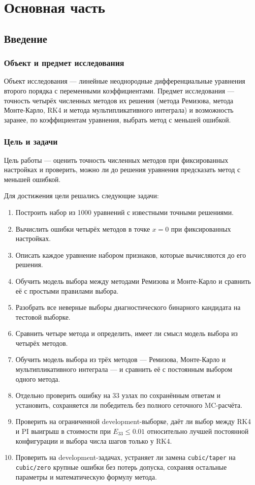 \documentclass[14pt,a4paper]{extarticle}
\DeclareRobustCommand{\code}[1]{\texttt{\let\savedunderscore\_\def\_{\savedunderscore\allowbreak}#1}}
\begin{document}
\section{Основная часть}
\subsection{Введение}
\subsubsection{Объект и предмет исследования}
Объект исследования --- линейные неоднородные дифференциальные
уравнения второго порядка с переменными коэффициентами. Предмет
исследования --- точность четырёх численных методов их решения (метода
Ремизова, метода Монте-Карло, RK4 и метода мультипликативного интеграла)
и возможность заранее, по коэффициентам уравнения, выбрать метод
с меньшей ошибкой.

\subsubsection{Цель и задачи}
Цель работы --- оценить точность численных методов при фиксированных
настройках и проверить, можно ли до решения уравнения предсказать метод
с меньшей ошибкой.

Для достижения цели решались следующие задачи:
\begin{enumerate}
\item Построить набор из 1000 уравнений с известными точными решениями.
\item Вычислить ошибки четырёх методов в точке $x=0$ при фиксированных
настройках.
\item Описать каждое уравнение набором признаков, которые вычисляются
до его решения.
\item Обучить модель выбора между методами Ремизова и Монте-Карло
и сравнить её с простыми правилами выбора.
\item Разобрать все неверные выборы диагностического бинарного
кандидата на тестовой выборке.
\item Сравнить четыре метода и определить, имеет ли смысл модель выбора
из четырёх методов.
\item Обучить модель выбора из трёх методов --- Ремизова, Монте-Карло
и мультипликативного интеграла --- и сравнить её с постоянным выбором
одного метода.
\item Отдельно проверить ошибку на 33 узлах по сохранённым ответам
и установить, сохраняется ли победитель без полного сеточного MC-расчёта.
\item Проверить на ограниченной development-выборке, даёт ли выбор
между RK4 и PI выигрыш в стоимости при $E_{33}\le0.01$ относительно
лучшей постоянной конфигурации и выбора числа шагов только у RK4.
\item Проверить на development-задачах, устраняет ли замена
\code{cubic/taper} на \code{cubic/zero} крупные ошибки без потерь
допуска, сохраняя остальные параметры и математическую формулу метода.
\end{enumerate}
\end{document}
